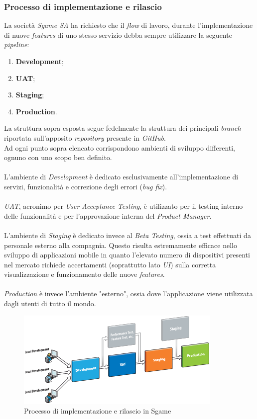 \documentclass[11pt]{thesistemp}
\begin{document}
\subsubsection{Processo di implementazione e rilascio}
La società \textit{Sgame SA} ha richiesto che il \textit{flow} di lavoro, durante l'implementazione di nuove \textit{features} di uno stesso servizio debba sempre utilizzare la seguente \textit{pipeline}:
\begin{enumerate}
	\item \textbf{Development};
	\item \textbf{UAT};
	\item \textbf{Staging};
	\item \textbf{Production}.
\end{enumerate}
La struttura sopra esposta segue fedelmente la struttura dei principali \textit{branch} riportata sull'apposito \textit{repository} presente in \textit{GitHub}.\\
Ad ogni punto sopra elencato corrispondono ambienti di sviluppo differenti, ognuno con uno scopo ben definito.\\\\
L'ambiente di \textit{Development} è dedicato esclusivamente all'implementazione di servizi, funzionalità e correzione degli errori (\textit{bug fix}).\\\\
\textit{UAT}, acronimo per \textit{User Acceptance Testing}, è utilizzato per il testing interno delle funzionalità e per l'approvazione interna del \textit{Product Manager}.\\\\
L'ambiente di \textit{Staging} è dedicato invece al \textit{Beta Testing}, ossia a test effettuati da personale esterno alla compagnia. Questo risulta estremamente efficace nello sviluppo di applicazioni mobile in quanto l'elevato numero di dispositivi presenti nel mercato richiede accertamenti (soprattutto lato \textit{UI}) sulla corretta visualizzazione e funzionamento delle nuove \textit{features}.\\\\
\textit{Production} è invece l'ambiente "esterno", ossia dove l'applicazione viene utilizzata dagli utenti di tutto il mondo.
\begin{figure}[h]
    \centering
    \includegraphics[scale=.85]{dev-flow.png}
        \caption{Processo di implementazione e rilascio in Sgame}
    \label{fig:dev-flow}
\end{figure}
\end{document}

